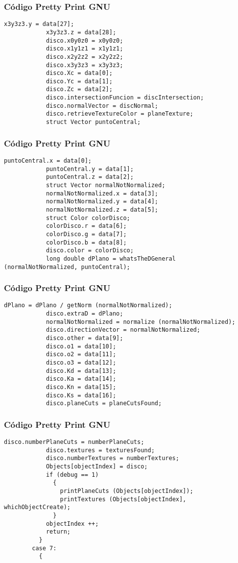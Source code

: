 \documentclass{beamer}
\begin{document}
\begin{frame}[fragile]
\frametitle{C\'odigo Pretty Print GNU}
\begin{lstlisting}[style=CStyle]
            x3y3z3.y = data[27];
            x3y3z3.z = data[28];
            disco.x0y0z0 = x0y0z0;
            disco.x1y1z1 = x1y1z1;
            disco.x2y2z2 = x2y2z2;
            disco.x3y3z3 = x3y3z3;
            disco.Xc = data[0];
            disco.Yc = data[1];
            disco.Zc = data[2];
            disco.intersectionFuncion = discIntersection;
            disco.normalVector = discNormal;
            disco.retrieveTextureColor = planeTexture;
            struct Vector puntoCentral;
\end{lstlisting}
\end{frame}
\begin{frame}[fragile]
\frametitle{C\'odigo Pretty Print GNU}
\begin{lstlisting}[style=CStyle]
            puntoCentral.x = data[0];
            puntoCentral.y = data[1];
            puntoCentral.z = data[2];
            struct Vector normalNotNormalized;
            normalNotNormalized.x = data[3];
            normalNotNormalized.y = data[4];
            normalNotNormalized.z = data[5];
            struct Color colorDisco;
            colorDisco.r = data[6];
            colorDisco.g = data[7];
            colorDisco.b = data[8];
            disco.color = colorDisco;
            long double dPlano = whatsTheDGeneral (normalNotNormalized, puntoCentral);
\end{lstlisting}
\end{frame}
\begin{frame}[fragile]
\frametitle{C\'odigo Pretty Print GNU}
\begin{lstlisting}[style=CStyle]
            dPlano = dPlano / getNorm (normalNotNormalized);
            disco.extraD = dPlano;
            normalNotNormalized = normalize (normalNotNormalized);
            disco.directionVector = normalNotNormalized;
            disco.other = data[9];
            disco.o1 = data[10];
            disco.o2 = data[11];
            disco.o3 = data[12];
            disco.Kd = data[13];
            disco.Ka = data[14];
            disco.Kn = data[15];
            disco.Ks = data[16];
            disco.planeCuts = planeCutsFound;
\end{lstlisting}
\end{frame}
\begin{frame}[fragile]
\frametitle{C\'odigo Pretty Print GNU}
\begin{lstlisting}[style=CStyle]
            disco.numberPlaneCuts = numberPlaneCuts;
            disco.textures = texturesFound;
            disco.numberTextures = numberTextures;
            Objects[objectIndex] = disco;
            if (debug == 1)
              {
                printPlaneCuts (Objects[objectIndex]);
                printTextures (Objects[objectIndex], whichObjectCreate);
              }
            objectIndex ++;
            return;
          }
        case 7:
          {
            \end{lstlisting}
\end{frame}
\end{document}
